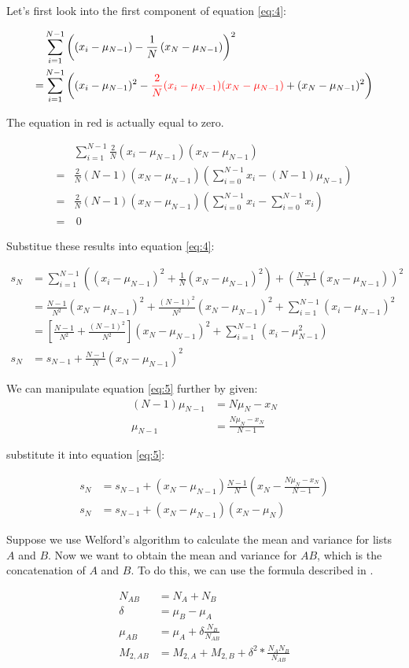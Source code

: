 Let's first look into the first component of equation \eqref{eq:4}:

\begin{align*}
&\sum_{i=1}^{N-1}\left(\left(x_i-\mu_{N-1}\right)-\frac{1}{N}\left(x_N-\mu_{N-1}\right)\right)^2 \\
=&\sum_{i=1}^{N-1}\left((x_i-\mu_{N-1})^2-\textcolor{red}{\frac{2}{N}(x_i-\mu_{N-1})(x_N-\mu_{N-1})}+(x_N-\mu_{N-1})^2\right) 
\end{align*}

The equation in red is actually equal to zero.

\begin{align*}
&\sum_{i=1}^{N-1}\frac{2}{N}(x_i-\mu_{N-1})(x_N-\mu_{N-1}) \\
=&\frac{2}{N}(N-1)(x_N-\mu_{N-1})\left(\sum_{i=0}^{N-1}x_i-(N-1)\mu_{N-1}\right) \\
=&\frac{2}{N}(N-1)(x_N-\mu_{N-1})\left(\sum_{i=0}^{N-1}x_i-\sum_{i=0}^{N-1}x_i\right) \\
=&\ 0
\end{align*}

Substitue these results into equation \eqref{eq:4}:

\begin{align*}
s_{N} &=\sum_{i=1}^{N-1}\left((x_i-\mu_{N-1})^2+\frac{1}{N}(x_N-\mu_{N-1})^2\right) + \left(\frac{N-1}{N}(x_N-\mu_{N-1})\right)^2 \\
&=\frac{N-1}{N^2}(x_N-\mu_{N-1})^2+\frac{(N-1)^2}{N^2}(x_N-\mu_{N-1})^2+\sum_{i=1}^{N-1}(x_i-\mu_{N-1})^2 \\
&=\left[\frac{N-1}{N^2} + \frac{(N-1)^2}{N^2}\right](x_N-\mu_{N-1})^2+\sum_{i=1}^{N-1}\left(x_i-\mu_{N-1}^2\right) \\
s_N&=s_{N-1} + \frac{N-1}{N}(x_N-\mu_{N-1})^2 \tag{5}\label{eq:5}
\end{align*}

We can manipulate equation \eqref{eq:5} further by given:
\begin{align*}
(N-1)\mu_{N-1} &= N\mu_N-x_N \\
\mu_{N-1} &= \frac{N\mu_{N}-x_N}{N-1}
\end{align*}

substitute it into equation \eqref{eq:5}:

\begin{align*}
s_N&=s_{N-1} + (x_N-\mu_{N-1})\frac{N-1}{N}(x_N-\frac{N\mu_{N}-x_N}{N-1}) \\
s_N&=s_{N-1} + (x_N-\mu_{N-1})(x_N-\mu_{N})
\end{align*}

Suppose we use Welford's algorithm to calculate the mean and variance for lists $A$ and $B$.
Now we want to obtain the mean and variance for $AB$, which is the concatenation of $A$ and $B$. To do this, we can use the formula described in \cite{chan1982updating}.

\begin{align*}
N_{AB} &= N_{A} + N_{B} \\
\delta &= \mu_B - \mu_A \\
\mu_{AB} &= \mu_A+\delta\frac{N_B}{N_{AB}} \\
M_{2, AB} &=M_{2,A}+M_{2,B}+\delta^2*\frac{N_A N_B}{N_{AB}}
\end{align*}